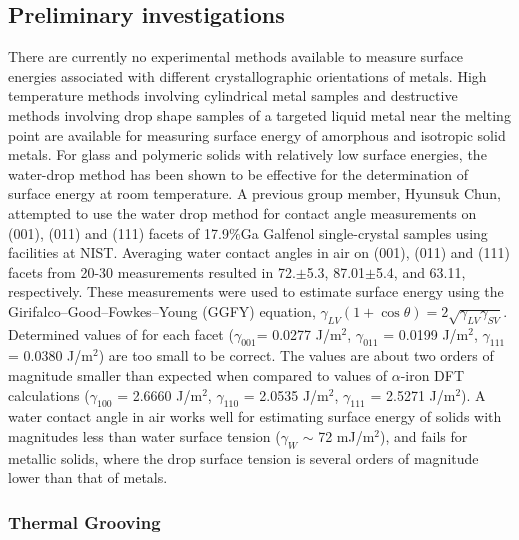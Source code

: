 \subsection{Preliminary investigations}
There are currently no experimental methods available to measure surface energies associated with different crystallographic orientations of metals. High temperature methods involving cylindrical metal samples and destructive methods involving drop shape samples of a targeted liquid metal near the melting point are available for measuring surface energy of amorphous and isotropic solid metals.\cite{Egry2010,Aqra2011,Cao2011} For glass and polymeric solids with relatively low surface energies, the water-drop method has been shown to be effective for the determination of surface energy at room temperature.\cite{Ahadian2010,Kwok2000,Tavana2005} A previous group member, Hyunsuk Chun, attempted to use the water drop method for contact angle measurements on \hkl(001), \hkl(011) and \hkl(111) facets of 17.9$\%$Ga Galfenol single-crystal samples using facilities at NIST.\cite{Costa2016} Averaging  water contact angles in air on \hkl(001), \hkl(011) and \hkl(111) facets from 20-30 measurements resulted in 72.$\pm$5.3\degree, 87.01$\pm$5.4\degree, and 63.11\degree, respectively. These measurements were used to estimate surface energy using the Girifalco–Good–Fowkes–Young (GGFY) equation, $\gamma_{LV} (1+\cos\theta) = 2 \sqrt{\gamma_{LV}\gamma_{SV}}$. Determined values of \gamSV for each facet ($ \gamma_{001} $= 0.0277 J/m$^2$, $\gamma_{011}$ = 0.0199 J/m$^2$, $\gamma_{111}$ = 0.0380 J/m$^2 $) are too small to be correct. The values are about two orders of magnitude smaller than expected when compared to values of $\alpha$-iron DFT calculations ($\gamma_{100}$ = 2.6660 J/m$^2$, $\gamma_{110}$ = 2.0535 J/m$^2$, $\gamma_{111}$ = 2.5271 J/m$^2$).\cite{Wang2000} A water contact angle in air works well for estimating surface energy of solids with magnitudes less than water surface tension ($\gamma_W$ $\sim$ 72 mJ/m$^2$), and fails for metallic solids, where the drop surface tension is several orders of magnitude lower than that of metals. 


\subsubsection{Thermal Grooving}

